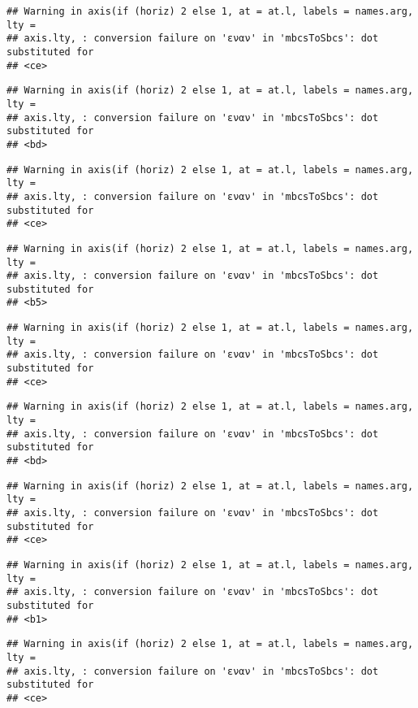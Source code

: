 \documentclass[
]{article}
\begin{document}
\begin{verbatim}
## Warning in axis(if (horiz) 2 else 1, at = at.l, labels = names.arg, lty =
## axis.lty, : conversion failure on 'εναν' in 'mbcsToSbcs': dot substituted for
## <ce>
\end{verbatim}

\begin{verbatim}
## Warning in axis(if (horiz) 2 else 1, at = at.l, labels = names.arg, lty =
## axis.lty, : conversion failure on 'εναν' in 'mbcsToSbcs': dot substituted for
## <bd>
\end{verbatim}

\begin{verbatim}
## Warning in axis(if (horiz) 2 else 1, at = at.l, labels = names.arg, lty =
## axis.lty, : conversion failure on 'εναν' in 'mbcsToSbcs': dot substituted for
## <ce>
\end{verbatim}

\begin{verbatim}
## Warning in axis(if (horiz) 2 else 1, at = at.l, labels = names.arg, lty =
## axis.lty, : conversion failure on 'εναν' in 'mbcsToSbcs': dot substituted for
## <b5>
\end{verbatim}

\begin{verbatim}
## Warning in axis(if (horiz) 2 else 1, at = at.l, labels = names.arg, lty =
## axis.lty, : conversion failure on 'εναν' in 'mbcsToSbcs': dot substituted for
## <ce>
\end{verbatim}

\begin{verbatim}
## Warning in axis(if (horiz) 2 else 1, at = at.l, labels = names.arg, lty =
## axis.lty, : conversion failure on 'εναν' in 'mbcsToSbcs': dot substituted for
## <bd>
\end{verbatim}

\begin{verbatim}
## Warning in axis(if (horiz) 2 else 1, at = at.l, labels = names.arg, lty =
## axis.lty, : conversion failure on 'εναν' in 'mbcsToSbcs': dot substituted for
## <ce>
\end{verbatim}

\begin{verbatim}
## Warning in axis(if (horiz) 2 else 1, at = at.l, labels = names.arg, lty =
## axis.lty, : conversion failure on 'εναν' in 'mbcsToSbcs': dot substituted for
## <b1>
\end{verbatim}

\begin{verbatim}
## Warning in axis(if (horiz) 2 else 1, at = at.l, labels = names.arg, lty =
## axis.lty, : conversion failure on 'εναν' in 'mbcsToSbcs': dot substituted for
## <ce>
\end{verbatim}
\end{document}
